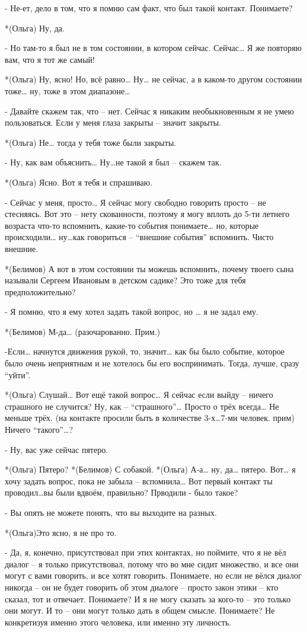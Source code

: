 - Не-ет, дело в том, что я помню сам факт, что был такой контакт. Понимаете?

*(Ольга) Ну, да.

- Но там-то я был не в том состоянии, в котором сейчас. Сейчас… Я же повторяю вам, что я тот же самый!

*(Ольга) Ну, ясно!  Но, всё равно… Ну… не сейчас, а в каком-то другом состоянии тоже… ну, тоже в этом диапазоне…

- Давайте скажем так, что – нет. Сейчас  я никаким необыкновенным я не умею пользоваться. Если у меня глаза закрыты – значит закрыты.

*(Ольга) Не… тогда у тебя тоже были закрыты.

- Ну, как вам объяснить… Ну…не такой я был – скажем так.

*(Ольга) Ясно. Вот я тебя и спрашиваю.

- Сейчас у меня, просто… Я сейчас могу свободно говорить просто – не стесняясь. Вот это – нету скованности, поэтому я могу вплоть до 5-ти летнего возраста что-то вспомнить, какие-то события понимаете… но, которые происходили… ну…как говориться – “внешние события” вспомнить. Чисто внешние.

*(Белимов)  А вот в этом состоянии ты можешь вспомнить, почему  твоего сына называли Сергеем Ивановым в детском садике? Это тоже для тебя предположительно?

- Я помню, что я ему хотел задать такой вопрос, но … я не задал ему.

*(Белимов) М-да…  (разочарованно. Прим.)

-Если… начнутся движения рукой, то, значит… как бы было событие, которое было очень неприятным и не хотелось бы его воспринимать. Тогда,  лучше, сразу “уйти”.


*(Ольга) Слушай… Вот ещё такой вопрос… Я сейчас если выйду – ничего страшного не случится?  Ну, как – “страшного”…  Просто о трёх всегда… Не меньше трёх. (на контакте просили быть в количестве 3-х…7-ми человек. прим)  Ничего “такого”…?

- Ну, вас уже сейчас пятеро.

*(Ольга) Пятеро?
*(Белимов) С собакой.
*(Ольга) А-а… ну, да… пятеро. Вот… я хочу задать вопрос, пока не забыла – вспомнила… Вот первый контакт ты проводил…вы были вдвоём, правильно? Прводили - было такое?

- Вы опять не можете понять, что вы выходите на разных.

*(Ольга)Это ясно, я не про то.

- Да, я, конечно, присутствовал при этих контактах, но поймите, что я не вёл диалог – я только присутствовал, потому что во мне сидит множество, и все они могут с вами говорить, и все хотят говорить. Понимаете, но если не вёлся диалог никогда – он не будет говорить об этом диалоге – просто закон этики – кто сказал, тот и отвечает. Понимаете? И я не могу сказать за кого-то – это только они могут. И то – они могут только дать в общем смысле. Понимаете? Не конкретизуя именно этого человека, или именно эту личность.


